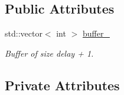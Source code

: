 \subsection*{Public Attributes}
\begin{DoxyCompactItemize}
\item 
std\-::vector$<$ int $>$ \hyperlink{classNeuron_a8343c4f29429df0b3a843fea612e4bd3}{buffer\-\_\-}
\begin{DoxyCompactList}\small\item\em Buffer of size delay + 1. \end{DoxyCompactList}\end{DoxyCompactItemize}
\subsection*{Private Attributes}
